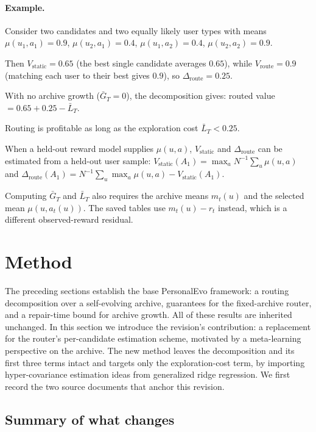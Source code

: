 \documentclass{article} %
\begin{document}
\paragraph{Example.} Consider two candidates and two equally likely user types with means $\mu(u_1,a_1)=0.9$, $\mu(u_2,a_1)=0.4$, $\mu(u_1,a_2)=0.4$, $\mu(u_2,a_2)=0.9$.

Then $V_{\mathrm{static}}=0.65$ (the best single candidate averages $0.65$), while $V_{\mathrm{route}}=0.9$ (matching each user to their best gives $0.9$), so $\Delta_{\mathrm{route}}=0.25$.

With no archive growth ($\bar G_T=0$), the decomposition gives: routed value $= 0.65 + 0.25 - \bar L_T$.

Routing is profitable as long as the exploration cost $\bar L_T < 0.25$.

When a held-out reward model supplies \(\mu(u,a)\),
\(V_{\mathrm{static}}\) and \(\Delta_{\mathrm{route}}\) can be estimated from a
held-out user sample:
\(V_{\mathrm{static}}(A_1)=\max_a N^{-1}\sum_u\mu(u,a)\) and
\(\Delta_{\mathrm{route}}(A_1)
=N^{-1}\sum_u\max_a\mu(u,a)-V_{\mathrm{static}}(A_1)\).

Computing \(\bar G_T\) and \(\bar L_T\) also requires the archive means
\(m_t(u)\) and the selected mean \(\mu(u,a_t(u))\). The saved tables use
\(m_t(u)-r_t\) instead, which is a different observed-reward residual.

\section{Method}

The preceding sections establish the base PersonalEvo framework: a routing decomposition over a self-evolving archive, guarantees for the fixed-archive router, and a repair-time bound for archive growth. All of these results are inherited unchanged. In this section we introduce the revision's contribution: a replacement for the router's per-candidate estimation scheme, motivated by a meta-learning perspective on the archive. The new method leaves the decomposition and its first three terms intact and targets only the exploration-cost term, by importing hyper-covariance estimation ideas from generalized ridge regression. We first record the two source documents that anchor this revision.







\subsection{Summary of what changes}
\end{document}
